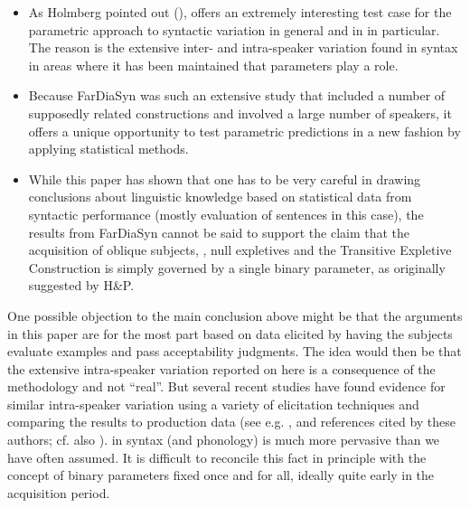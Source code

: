 \documentclass[output=paper]{LSP/langsci}
\begin{document}
\begin{itemize}
\item As Holmberg pointed out (\citeyear[13n]{Holmberg2010parameters}),  offers an extremely interesting test case for the parametric approach to syntactic variation in general and in  in particular. The reason is the extensive inter- and intra-speaker variation found in  syntax in areas where it has been maintained that parameters play a role.
\item  Because FarDiaSyn was such an extensive study that included a number of supposedly related constructions and involved a large number of speakers, it offers a unique opportunity to test parametric predictions in a new fashion by applying statistical methods.
\item While this paper has shown that one has to be very careful in drawing conclusions about linguistic knowledge based on statistical data from syntactic performance (mostly evaluation of sentences in this case), the results from FarDiaSyn cannot be said to support the claim that the acquisition of oblique subjects, , null expletives and the Transitive Expletive Construction is simply governed by a single binary parameter, as originally suggested by H{\&}P.
\end{itemize}

One possible objection to the main conclusion above might be that the arguments in this paper are for the most part based on data elicited by having the subjects evaluate examples and pass acceptability judgments. The idea would then be that the extensive intra-speaker variation reported on here is a consequence of the methodology and not “real”. But several recent studies have found evidence for similar intra-speaker variation using a variety of elicitation techniques and comparing the results to production data (see e.g. \citealt[184–186]{Thráinsson2013variation}, \citealt{Nowenstein2014} and references cited by these authors; cf. also \citealt{Jónsson2005}).  in syntax (and phonology) is much more pervasive than we have often assumed. It is difficult to reconcile this fact in principle with the concept of binary parameters fixed once and for all, ideally quite early in the acquisition period.
\end{document}

